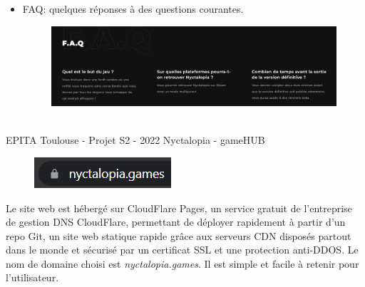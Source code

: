 \begin{itemize}
    \item FAQ: quelques réponses à des questions courantes.

\begin{figure}[H]
\centering
\begin{minipage}{.5\textwidth}
  \centering
  \centerline{\includegraphics[width=1\linewidth]{img/faq.png}}
  \label{fig:faq}
\end{minipage}%
\end{figure}

\end{itemize}

\vfill
\noindent\makebox[\linewidth]{\rule{.8\paperwidth}{.6pt}}\\[0.2cm]
EPITA Toulouse - Projet S2 - 2022 \hfill Nyctalopia - gameHUB
\noindent\makebox[\linewidth]{\rule{.8\paperwidth}{.6pt}}
\newpage


\begin{figure}[H]
\centering
\begin{minipage}{.5\textwidth}
  \centering
  \centerline{\includegraphics[width=1.5\linewidth]{img/ssl.png}}
  \label{fig:ssl}
\end{minipage}%
\end{figure}

Le site web est hébergé sur CloudFlare Pages, un service gratuit de l'entreprise de gestion DNS CloudFlare, permettant de déployer rapidement à partir d'un repo Git, un site web statique rapide grâce aux serveurs CDN disposés partout dans le monde et sécurisé par un certificat SSL et une protection anti-DDOS.
Le nom de domaine choisi est \emph{nyctalopia.games}. Il est simple et facile à retenir pour l'utilisateur.

